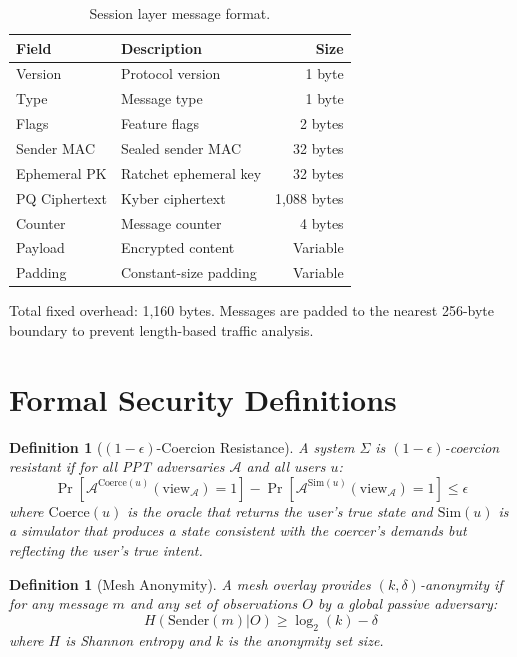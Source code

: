 \documentclass[11pt,a4paper,twocolumn]{article}
\newtheorem{definition}[theorem]{Definition}
\begin{document}
\begin{table}[H]
\centering
\caption{Session layer message format.}
\begin{tabularx}{\columnwidth}{lXr}
\toprule
\textbf{Field} & \textbf{Description} & \textbf{Size} \\
\midrule
Version & Protocol version & 1 byte \\
Type & Message type & 1 byte \\
Flags & Feature flags & 2 bytes \\
Sender MAC & Sealed sender MAC & 32 bytes \\
Ephemeral PK & Ratchet ephemeral key & 32 bytes \\
PQ Ciphertext & Kyber ciphertext & 1,088 bytes \\
Counter & Message counter & 4 bytes \\
Payload & Encrypted content & Variable \\
Padding & Constant-size padding & Variable \\
\bottomrule
\end{tabularx}
\end{table}

Total fixed overhead: 1,160 bytes. Messages are padded to the nearest 256-byte boundary to prevent length-based traffic analysis.

\section{Formal Security Definitions}
\label{app:security}

\begin{definition}[$(1-\epsilon)$-Coercion Resistance]
A system $\Sigma$ is $(1-\epsilon)$-coercion resistant if for all PPT adversaries $\mathcal{A}$ and all users $u$:
$$\Pr[\mathcal{A}^{\text{Coerce}(u)}(\text{view}_{\mathcal{A}}) = 1] - \Pr[\mathcal{A}^{\text{Sim}(u)}(\text{view}_{\mathcal{A}}) = 1] \leq \epsilon$$
where $\text{Coerce}(u)$ is the oracle that returns the user's true state and $\text{Sim}(u)$ is a simulator that produces a state consistent with the coercer's demands but reflecting the user's true intent.
\end{definition}

\begin{definition}[Mesh Anonymity]
A mesh overlay provides $(k, \delta)$-anonymity if for any message $m$ and any set of observations $O$ by a global passive adversary:
$$H(\text{Sender}(m) | O) \geq \log_2(k) - \delta$$
where $H$ is Shannon entropy and $k$ is the anonymity set size.
\end{definition}
\end{document}
